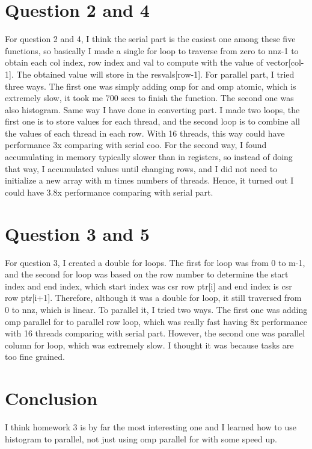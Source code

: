 \documentclass{article}
\begin{document}
\section{Question 2 and 4}
For question 2 and 4, I think the serial part is the easiest one among these five functions, so basically I made a single for loop to traverse from zero to nnz-1 to obtain each col index, row index and val to compute with the value of vector[col-1]. The obtained value will store in the resvals[row-1]. For parallel part, I tried three ways. The first one was simply adding omp for and omp atomic, which is extremely slow, it took me 700 secs to finish the function. The second one was also histogram. Same way I have done in converting part. I made two loops, the first one is to store values for each thread, and the second loop is to combine all the values of each thread in each row. With 16 threads, this way could have performance 3x comparing with serial coo. For the second way, I found accumulating in memory typically slower than in registers, so instead of doing that way, I accumulated values until changing rows, and I did not need to initialize a new array with m times numbers of threads. Hence, it turned out I could have 3.8x performance comparing with serial part. 

\section{Question 3 and 5}
For question 3, I created a double for loops. The first for loop was from 0 to m-1, and the second for loop was based on the row number to determine the start index and end index, which start index was csr row ptr[i] and end index is csr row ptr[i+1]. Therefore, although it was a double for loop, it still traversed from 0 to nnz, which is linear. To parallel it, I tried two ways. The first one was adding omp parallel for to parallel row loop, which was really fast having 8x performance with 16 threads comparing with serial part. However, the second one was parallel column for loop, which was extremely slow. I thought it was because tasks are too fine grained.

\section{Conclusion}
I think homework 3 is by far the most interesting one and I learned how to use histogram to parallel, not just using omp parallel for with some speed up. 








 
\end{document}
